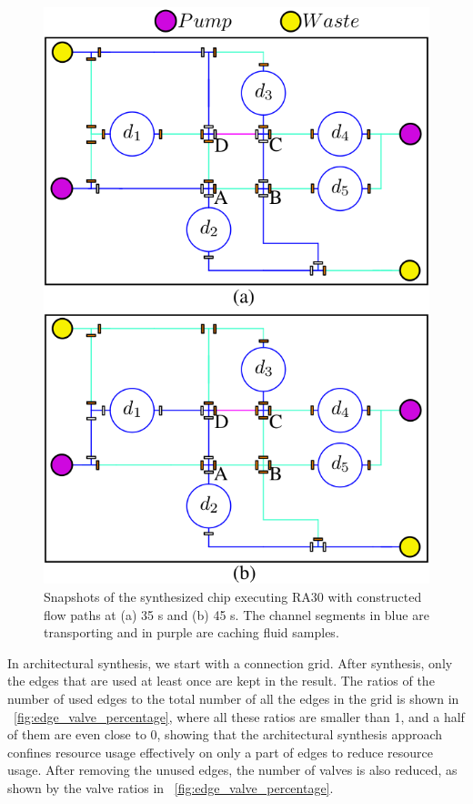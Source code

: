 \begin{figure}[t]
    \centering
    \includegraphics[width=0.7\linewidth]{Visio/RA30_exe_flow_test.png}
  \caption{Snapshots of the synthesized chip executing RA30 with constructed flow paths at (a) 35 s and (b) 45 s. The channel segments in blue are transporting and in purple are caching fluid samples.}
      \label{fig:RA30_exe_2}
\end{figure}

In architectural synthesis, we start with a connection grid. After synthesis, only the edges that are used at least once are kept in the result. The ratios of the number of used edges to the total number of all the edges in the grid is shown in \figname~\ref{fig:edge_valve_percentage}, where all these ratios are smaller than 1, and a half of them are even close to 0, showing that the architectural synthesis approach confines resource usage effectively on only a part of edges to reduce resource usage.  After removing the unused edges, the number of valves is also reduced, as shown by the valve ratios in \figname~\ref{fig:edge_valve_percentage}.
%      

